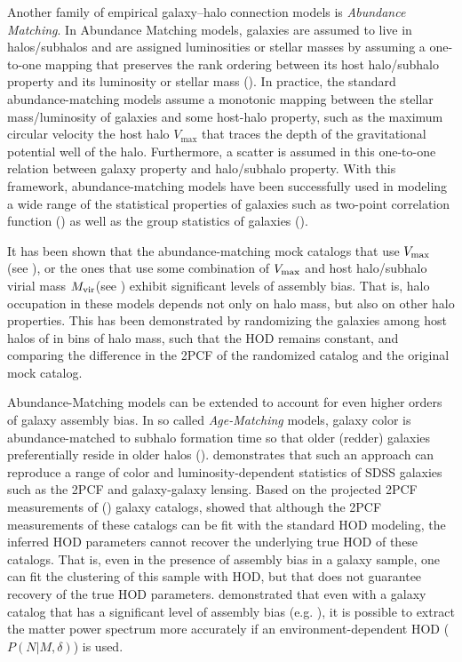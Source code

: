\documentclass[12pt, preprint]{aastex}
\begin{document}
Another family of empirical galaxy--halo connection models is \emph{Abundance} \emph{Matching}. In Abundance Matching models, galaxies are assumed to live in halos/subhalos and are assigned luminosities or stellar masses by assuming a one-to-one mapping that preserves the rank ordering between its host halo/subhalo property and its luminosity or stellar mass
(\citealt{kravtsov2004,vale2004,tasitsiomi2004,conroy2009,guo2010,wetzel2010,Neisten2011,watson2012,rodriguez2012,kravstov2013,mao2015,chavez2016}). 
In practice, the standard abundance-matching models assume a monotonic mapping between the stellar mass/luminosity of galaxies and some host-halo property, such as 
the maximum circular velocity the host halo $V_\mathrm{max}$ that traces the depth of the gravitational potential well of the halo. Furthermore, a scatter is assumed in this one-to-one relation between galaxy property and halo/subhalo property. With this framework, abundance-matching models have been successfully used in modeling a wide range of the 
statistical properties of galaxies such as two-point correlation function (\citealt{reddick2013,lehman2015,hod_vs_sham}) as well as the group statistics of galaxies (\citealt{sham_gmf}). 

It has been shown that the abundance-matching mock catalogs that use $V_{\rm max}$ (see \citealt{hw2013,arz2014}), or the ones that use some combination of $V_{\rm max}$ and host halo/subhalo virial mass $M_{\rm vir} $(see \citealt{lehman2015}) exhibit significant levels of assembly bias. That is, halo occupation in these models depends not only on halo mass, but also on other halo properties. This has been demonstrated by randomizing the galaxies among host halos of in bins of halo mass, such that the HOD remains constant, and comparing the difference in the 2PCF of the randomized catalog and the original mock catalog.  

Abundance-Matching models can be extended to account for even higher orders of galaxy 
assembly bias. In so called \emph{Age-Matching} models, galaxy color is abundance-matched
to subhalo formation time so that older (redder) galaxies preferentially reside in older halos (\citealt{hw2013}). \citet{hearin2014} demonstrates that such an approach can reproduce a range of color and luminosity-dependent statistics of SDSS galaxies such as the 2PCF and galaxy-galaxy lensing. Based on the projected 2PCF measurements of (\citealt{hw2013}) galaxy catalogs, \citet{arz2014} showed that although the 2PCF measurements of these catalogs can be fit with the standard HOD modeling, the inferred HOD parameters cannot recover the underlying true HOD of these catalogs. That is, even in the presence of assembly bias in a galaxy sample, one can fit the clustering of this sample with HOD, but that does not guarantee recovery of the true HOD parameters. \citet{mcewen2016} demonstrated that even with a galaxy catalog that has a significant level of assembly bias (e.g. \citealt{hw2013}), it is possible to extract the matter power spectrum more accurately if an environment-dependent HOD ($P(N|M,\delta)$) is used. 
\end{document}
